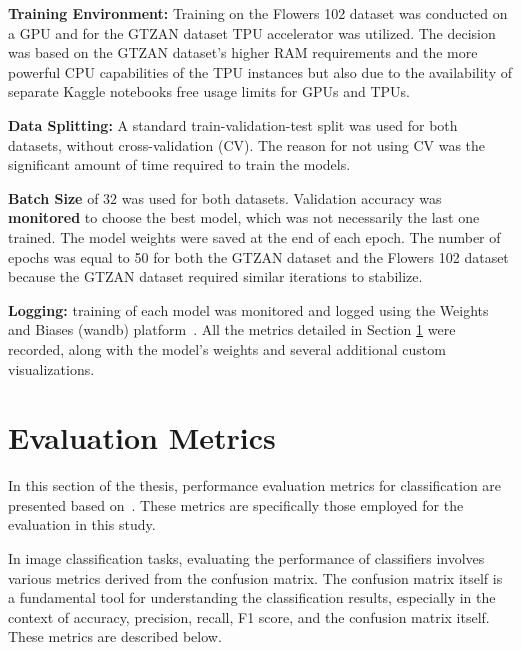 \textbf{Training Environment:} Training on the Flowers 102 dataset was conducted on a GPU and for the GTZAN dataset TPU accelerator was utilized. The decision was based on the GTZAN dataset's higher RAM requirements and the more powerful CPU capabilities of the TPU instances but also due to the availability of separate Kaggle notebooks free usage limits for GPUs and TPUs. 

\textbf{Data Splitting:} A standard train-validation-test split was used for both datasets, without cross-validation (CV). The reason for not using CV was the significant amount of time required to train the models.

\textbf{Batch Size} of $32$ was used for both datasets. Validation accuracy was \textbf{monitored} to choose the best model, which was not necessarily the last one trained. The model weights were saved at the end of each epoch. The number of epochs was equal to 50 for both the GTZAN dataset and the Flowers 102 dataset because the GTZAN dataset required similar iterations to stabilize.

\textbf{Logging:} training of each model was monitored and logged using the Weights and Biases (wandb) platform~\cite{wandb}. All the metrics detailed in Section \ref{sec:evaluationMetrics} were recorded, along with the model's weights and several additional custom visualizations.



\section{Evaluation Metrics}
\label{sec:evaluationMetrics}

In this section of the thesis, performance evaluation metrics for classification are presented based on~\cite{ClassificationMetrics}. These metrics are specifically those employed for the evaluation in this study.

In image classification tasks, evaluating the performance of classifiers involves various metrics derived from the confusion matrix. The confusion matrix itself is a fundamental tool for understanding the classification results, especially in the context of accuracy, precision, recall, F1 score, and the confusion matrix itself. These metrics are described below.

